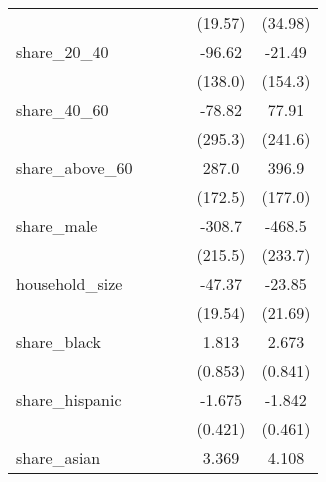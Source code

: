 {\begin{tabular}{l*{5}{c}}
            &                     &                     &                     &     (19.57)         &     (34.98)         \\
[1em]
share\_20\_40 &                     &                     &                     &      -96.62         &      -21.49         \\
            &                     &                     &                     &     (138.0)         &     (154.3)         \\
[1em]
share\_40\_60 &                     &                     &                     &      -78.82         &       77.91         \\
            &                     &                     &                     &     (295.3)         &     (241.6)         \\
[1em]
share\_above\_60&                     &                     &                     &       287.0         &       396.9\sym{*}  \\
            &                     &                     &                     &     (172.5)         &     (177.0)         \\
[1em]
share\_male  &                     &                     &                     &      -308.7         &      -468.5\sym{*}  \\
            &                     &                     &                     &     (215.5)         &     (233.7)         \\
[1em]
household\_size&                     &                     &                     &      -47.37\sym{*}  &      -23.85         \\
            &                     &                     &                     &     (19.54)         &     (21.69)         \\
[1em]
share\_black &                     &                     &                     &       1.813\sym{*}  &       2.673\sym{**} \\
            &                     &                     &                     &     (0.853)         &     (0.841)         \\
[1em]
share\_hispanic&                     &                     &                     &      -1.675\sym{***}&      -1.842\sym{***}\\
            &                     &                     &                     &     (0.421)         &     (0.461)         \\
[1em]
share\_asian &                     &                     &                     &       3.369\sym{**} &       4.108\sym{***}\\

\end{tabular}}
